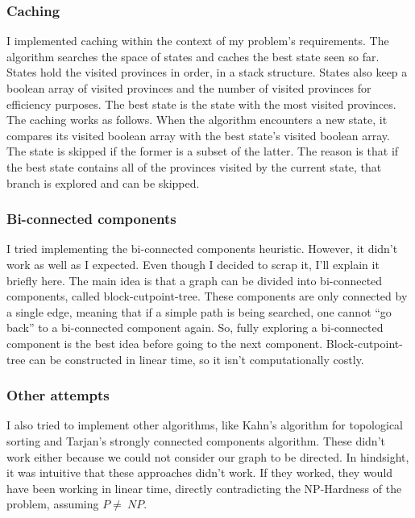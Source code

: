 \documentclass[12pt,a4paper]{article}
\begin{document}
\subsubsection{Caching}

I implemented caching within the context of my problem's requirements. The
algorithm searches the space of states and caches the best state seen so far.
States hold the visited provinces in order, in a stack structure. States also
keep a boolean array of visited provinces and the number of visited provinces
for efficiency purposes. The best state is the state with the most visited
provinces. The caching works as follows. When the algorithm encounters a new
state, it compares its visited boolean array with the best state's visited
boolean array. The state is skipped if the former is a subset of the latter. The
reason is that if the best state contains all of the provinces visited by the
current state, that branch is explored and can be skipped.

\subsubsection{Bi-connected components}

I tried implementing the bi-connected components heuristic. However, it didn't
work as well as I expected. Even though I decided to scrap it, I'll explain it
briefly here. The main idea is that a graph can be divided into bi-connected
components, called block-cutpoint-tree. These components are only connected by a
single edge, meaning that if a simple path is being searched, one cannot ``go
back'' to a bi-connected component again. So, fully exploring a bi-connected
component is the best idea before going to the next component.
Block-cutpoint-tree can be constructed in linear time, so it isn't
computationally costly.

\subsubsection{Other attempts}

I also tried to implement other algorithms, like Kahn's algorithm for
topological sorting and Tarjan's strongly connected components algorithm. These
didn't work either because we could not consider our graph to be directed. In
hindsight, it was intuitive that these approaches didn't work. If they worked,
they would have been working in linear time, directly contradicting the
NP-Hardness of the problem, assuming \(P \neq\ NP\).
\end{document}
